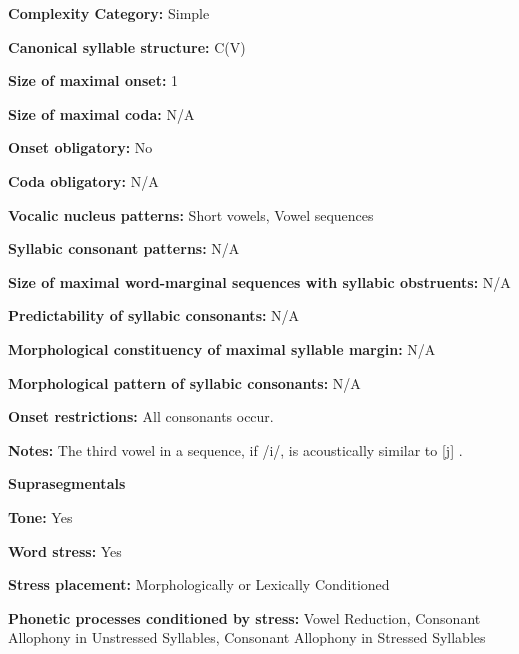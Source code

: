 \textbf{Complexity Category:} Simple



\textbf{Canonical syllable structure:} C(V) \citep[163-7]{Chacon2012}



\textbf{Size of maximal onset:} 1



\textbf{Size of maximal coda:} N/A



\textbf{Onset obligatory:} No



\textbf{Coda obligatory:} N/A



\textbf{Vocalic nucleus patterns:} Short vowels, Vowel sequences



\textbf{Syllabic consonant patterns:} N/A



\textbf{Size of maximal word{}-marginal sequences with syllabic obstruents:} N/A



\textbf{Predictability of syllabic consonants:} N/A



\textbf{Morphological constituency of maximal syllable margin:} N/A



\textbf{Morphological pattern of syllabic consonants:} N/A



\textbf{Onset restrictions:} All consonants occur.



\textbf{Notes:} The third vowel in a sequence, if /i/, is acoustically similar to [j] \citep[52]{Chacon2012}.



\textbf{Suprasegmentals}



\textbf{Tone:} Yes



\textbf{Word stress:} Yes



\textbf{Stress placement:} Morphologically or Lexically Conditioned



\textbf{Phonetic processes conditioned by stress:} Vowel Reduction, Consonant Allophony in Unstressed Syllables, Consonant Allophony in Stressed Syllables



